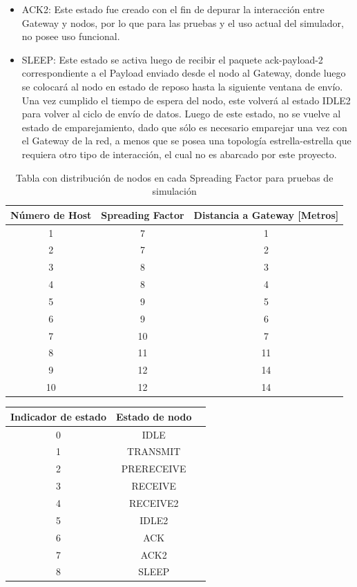 \begin{justify}
\begin{itemize}
\item ACK2: Este estado fue creado con el fin de depurar la interacción entre Gateway y nodos, por lo que para las pruebas y el uso actual del simulador, no posee uso funcional.
\item SLEEP: Este estado se activa luego de recibir el paquete ack-payload-2 correspondiente a el Payload enviado desde el nodo al Gateway, donde luego se colocará al nodo en estado de reposo hasta la siguiente ventana de envío. Una vez cumplido el tiempo de espera del nodo, este volverá al estado IDLE2 para volver al ciclo de envío de datos. Luego de este estado, no se vuelve al estado de emparejamiento, dado que sólo es necesario emparejar una vez con el Gateway de la red, a menos que se posea una topología estrella-estrella que requiera otro tipo de interacción, el cual no es abarcado por este proyecto.
\end{itemize}

\begin{table}[!ht]
\centering
\begin{tabular}{|c|c|c|}
\hline
Número de Host & Spreading Factor & Distancia a Gateway [Metros]\\ 
\hline
1 & 7 & 1 \\
\hline
2 & 7 & 2 \\
\hline
3 & 8 & 3 \\
\hline
4 & 8 & 4 \\
\hline
5 & 9 & 5 \\
\hline
6 & 9 & 6 \\
\hline
7 & 10 & 7 \\
\hline
8 & 11 & 11 \\
\hline
9 & 12 & 14 \\
\hline
10 & 12 & 14 \\
\hline
\end{tabular}
\caption{Tabla con distribución de nodos en cada Spreading Factor para pruebas de simulación}
\label{tab:prueba}
\end{table}

\begin{table}[!ht]
\centering
\begin{tabular}{|c|c|c|}
\hline
Indicador de estado & Estado de nodo\\ 
\hline
0& IDLE \\
\hline
1& TRANSMIT \\
\hline
2& PRERECEIVE\\
\hline
3& RECEIVE\\
\hline
4& RECEIVE2\\
\hline
5& IDLE2\\
\hline
6& ACK\\
\hline
7& ACK2\\
\hline
8& SLEEP\\
\hline


\end{tabular}
\end{table}
\end{justify}
